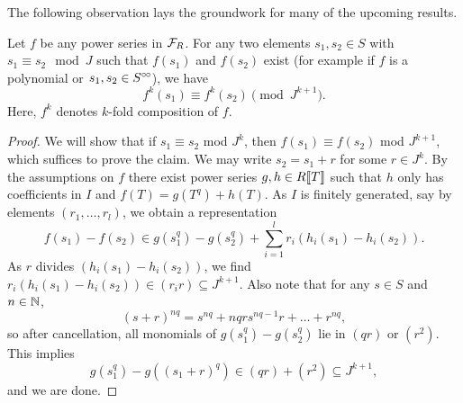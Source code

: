 The following observation lays the groundwork for many of the upcoming results.
\begin{lem}\label{lem:cryscalc}
  Let $f$ be any power series in $\mathcal{F}_R$. For any two elements $s_1,s_2 \in S$ 
  with $s_1 \equiv s_2 \mod J$ such that $f(s_1)$ and $f(s_2)$ exist (for
  example if $f$ is a polynomial or $s_1, s_2 \in S^{\circ \hspace{-0.5pt} \circ}$), we have 
  \begin{equation*}
    f^k(s_1) \equiv f^k(s_2) \pmod {J^{k+1}}.
  \end{equation*}
  Here, $f^k$ denotes $k$-fold composition of $f$.
\begin{proof}
  We will show that if $s_1 \equiv s_2$ mod $J^k$, then $f(s_1) \equiv f(s_2)$ mod 
  $J^{k+1}$, which suffices to prove the claim. 
  We may write $s_2 = s_1 + r$ for some $r\in J^k$. By the assumptions on $f$
  there exist power series 
  $g,h \in R\llbracket T \rrbracket$ such that $h$ only
  has coefficients in $I$ and $f(T) = g(T^q) + h(T)$. As $I$ is finitely generated,
  say by elements $(r_1, \dots, r_l)$, we obtain a representation 
  \begin{equation*}
    f(s_1) - f(s_2) \in g(s_1^{q})-g(s_2^{q}) + \sum_{i=1}^l r_i \left(h_i(s_1) -
    h_i(s_2)\right).
  \end{equation*}
  As $r$ divides $\left(h_i(s_1) - h_i(s_2)\right)$, we find
  $r_i(h_i(s_1) - h_i(s_2)) \in (r_i r) \subseteq J^{k+1}$. Also note that 
  for any $s\in S$ and $n \in \mathbb{N}$, 
  $$(s+r)^{nq} = s^{nq} + nqrs^{nq-1}r + \dots + r^{nq},$$
  so after cancellation, all monomials of $g(s_1^q) - g(s_2^q)$ lie in
  $(qr)$ or $(r^2)$. This implies
  \begin{equation*}
    g(s_1^q) - g\left((s_1+r)^q\right) \in (qr) + (r^2) \subseteq J^{k+1},
  \end{equation*}
  and we are done.
\end{proof}
\end{lem}

